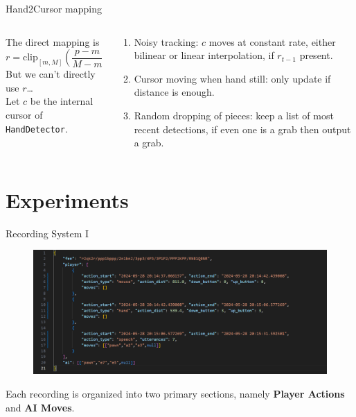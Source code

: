 \documentclass[english]{beamer}
\begin{document}
\begin{frame}{Hand2Cursor mapping}
    \begin{columns}
        \begin{column}{.5\textwidth}
            The direct mapping is
            \begin{equation}
                r = \mathrm{clip}_{[m,M]}(\frac{p - m}{M - m}).
            \end{equation}
            But we can't directly use $r$\dots\\
            Let $c$ be the internal cursor of \texttt{HandDetector}.
        \end{column}
        \begin{column}{.5\textwidth}
            \begin{enumerate}
                \item Noisy tracking: $c$ moves at constant rate, either bilinear or linear interpolation, if $r_{t-1}$ present.
                \item Cursor moving when hand still: only update if distance is enough.
                \item Random dropping of pieces: keep a list of most recent detections, if even one is a grab then output a grab.
            \end{enumerate}
        \end{column}
    \end{columns}
\end{frame}


\section{Experiments}
\begin{frame}{Recording System I}
    \begin{figure}
        \centering
        \includegraphics[width=.98\textwidth]{images/example_record3.png}
    \end{figure}
    Each recording is organized into two primary sections, namely \textbf{Player Actions} and \textbf{AI Moves}.
\end{frame}
\end{document}
